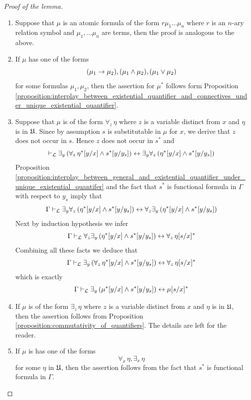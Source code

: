 \documentclass[10pt]{amsart}
\begin{document}
\begin{proof}[Proof of the lemma]
\begin{enumerate}[label=\textbf{(\arabic*)}, leftmargin=3.0em]
          Combining all these results together and using Proposition \ref{proposition:commutativity_of_quantifiers} we infer
		      $$\Gamma \vdash_{\cL} \exists_y\left(\mu^*[y_{\mu[s/x]}/y_\mu,y/x] \wedge s^*[y/y_s]\right) \leftrightarrow \mu[s/x]^*$$
        \item Suppose that $\mu$ is an atomic formula of the form $r\mu_1...\mu_n$ where $r$ is an $n$-ary relation symbol and $\mu_1,...\mu_n$ are terms, then the proof is analogous to the above.
        \item If $\mu$ has one of the forms
		      $$(\mu_1 \rightarrow \mu_2), (\mu_1 \wedge \mu_2), (\mu_1 \vee \mu_2)$$
          for some formulas $\mu_1,\mu_2$, then the assertion for $\mu^*$ follows form Proposition \ref{proposition:interplay_between_existential_quantifier_and_connectives_under_unique_existential_quantifier}.
        \item Suppose that $\mu$ is of the form $\forall_z\,\eta$ where $z$ is a variable distinct from $x$ and $\eta$ is in ${\mathfrak U}$. Since by assumption $s$ is substitutable in $\mu$ for $x$, we derive that $z$ does not occur in $s$. Hence $z$ does not occur in $s^*$ and
          $$\vdash_{{\mathcal L}} \exists_y\left(\forall_z\,\eta^*[y/x]\wedge s^*[y/y_s]\right) \leftrightarrow \exists_y\forall_z\left(\eta^*[y/x] \wedge s^*[y/y_s]\right)$$
          Proposition \ref{proposition:interplay_between_general_and_existential_quantifier_under_unique_existential_quantifer} and the fact that $s^*$ is functional formula in $\Gamma$ with respect to $y_s$ imply that
          $$\Gamma \vdash_{{\mathcal L}} \exists_y\forall_z\left(\eta^*[y/x] \wedge s^*[y/y_s]\right) \leftrightarrow \forall_z\exists_y\left(\eta^*[y/x] \wedge s^*[y/y_s]\right)$$
          Next by induction hypothesis we infer
          $$\Gamma \vdash_{{\mathcal L}} \forall_z\exists_y\left(\eta^*[y/x] \wedge s^*[y/y_s]\right) \leftrightarrow \forall_z\,\eta[s/x]^*$$
          Combining all these facts we deduce that
          $$\Gamma \vdash_{{\mathcal L}} \exists_y\left(\forall_z\,\eta^*[y/x]\wedge s^*[y/y_s]\right) \leftrightarrow \forall_z\,\eta[s/x]^*$$
          which is exactly
          $$\Gamma \vdash_{{\mathcal L}} \exists_y\left(\mu^*[y/x] \wedge s^*[y/y_s]\right) \leftrightarrow \mu[s/x]^*$$
        \item If $\mu$ is of the form $\exists_z\,\eta$ where $z$ is a variable distinct from $x$ and $\eta$ is in ${\mathfrak U}$, then the assertion follows from Proposition \ref{proposition:commutativity_of_quantifiers}. The details are left for the reader.
        \item If $\mu$ is has one of the forms
          $$\forall_x\,\eta,\exists_x\,\eta$$
          for some $\eta$ in ${\mathfrak U}$, then the assertion follows from the fact that $s^*$ is functional formula in $\Gamma$.
	\end{enumerate}
  

\end{proof}
\end{document}
